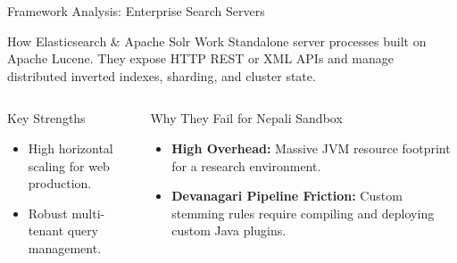 \documentclass[aspectratio=169]{beamer}
\begin{document}
\begin{frame}{Framework Analysis: Enterprise Search Servers}
  \begin{block}{How Elasticsearch \& Apache Solr Work}
    Standalone server processes built on Apache Lucene. They expose HTTP REST or XML APIs and manage distributed inverted indexes, sharding, and cluster state.
  \end{block}
  
  \vspace{0.2cm}
  \begin{columns}
    \begin{exampleblock}{Key Strengths}
      \begin{itemize}
        \item High horizontal scaling for web production.
        \item Robust multi-tenant query management.
      \end{itemize}
    \end{exampleblock}
    
    \begin{alertblock}{Why They Fail for Nepali Sandbox}
      \begin{itemize}
        \item \textbf{High Overhead:} Massive JVM resource footprint for a research environment.
        \item \textbf{Devanagari Pipeline Friction:} Custom stemming rules require compiling and deploying custom Java plugins.
      \end{itemize}
    \end{alertblock}
  \end{columns}
\end{frame}
\end{document}
